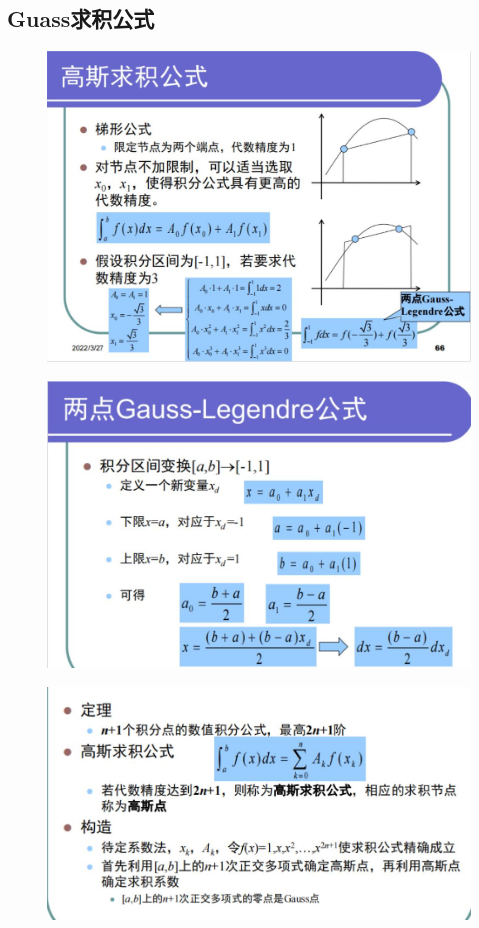 \documentclass[a4paper,12pt]{ctexart}
\begin{document}
\subsection{Guass求积公式}
\begin{figure}[H]
    \centering
    \includegraphics[width=14cm]{第五章作业/gs1.jpg}
\end{figure}
\begin{figure}[H]
    \centering
    \includegraphics[width=14cm]{第五章作业/gs2.jpg}
\end{figure}
\begin{figure}[H]
    \centering
    \includegraphics[width=14cm]{第五章作业/gs3.jpg}
\end{figure}
\end{document}
